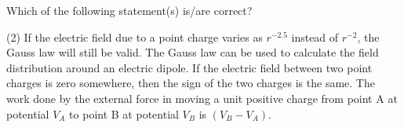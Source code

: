 
\item Which of the following statement(s) is/are correct?
    \begin{tasks}(2)
        \task If the electric field due to a point charge varies as \( r^{-2.5} \) instead of \( r^{-2} \), the Gauss law will still be valid.
        \task The Gauss law can be used to calculate the field distribution around an electric dipole.
        \task If the electric field between two point charges is zero somewhere, then the sign of the two charges is the same.
        \task The work done by the external force in moving a unit positive charge from point A at potential \( V_A \) to point B at potential \( V_B \) is \( (V_B - V_A) \).
    \end{tasks}
